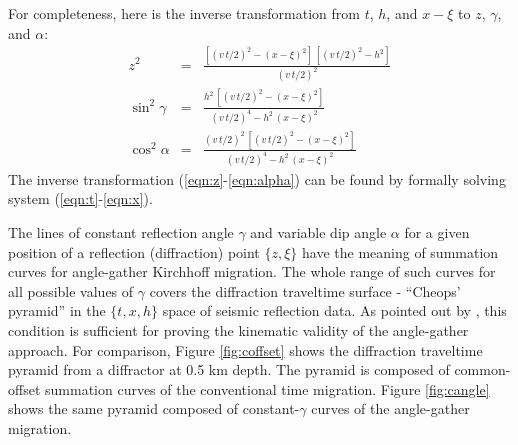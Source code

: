 For completeness, here is the inverse transformation from $t$, $h$,
and $x-\xi$ to $z$, $\gamma$, and $\alpha$:
\begin{eqnarray}
  \label{eqn:z}
  z^2 & = & 
  \frac{
    \left[(v\,t/2)^2 - (x-\xi)^2\right]\,
    \left[(v\,t/2)^2 - h^2\right]
    }{(v\,t/2)^2} 
  \\ \label{eqn:gamma}
  \sin^2{\gamma} & = & 
  \frac{h^2\, \left[(v\,t/2)^2 - (x-\xi)^2\right]}
  {(v\,t/2)^4 - h^2\,(x-\xi)^2}
  \\ \label{eqn:alpha}
  \cos^2{\alpha} & = & 
  \frac{(v\,t/2)^2\, \left[(v\,t/2)^2 - (x-\xi)^2\right]}
  {(v\,t/2)^4 - h^2\,(x-\xi)^2}
\end{eqnarray}
The inverse transformation (\ref{eqn:z}-\ref{eqn:alpha}) can be found
by formally solving system (\ref{eqn:t}-\ref{eqn:x}).
\par
The lines of constant reflection angle $\gamma$ and variable dip angle
$\alpha$ for a given position of a reflection (diffraction) point
$\{z,\xi\}$ have the meaning of summation curves for angle-gather
Kirchhoff migration. The whole range of such curves for all possible
values of $\gamma$ covers the diffraction traveltime surface -
``Cheops' pyramid'' \cite[]{Claerbout.blackwell.85} in the $\{t,x,h\}$
space of seismic reflection data.  As pointed out by
\cite{SEG-1997-1571}, this condition is sufficient for proving the
kinematic validity of the angle-gather approach.  For comparison,
Figure \ref{fig:coffset} shows the diffraction traveltime pyramid from
a diffractor at 0.5 km depth.  The pyramid is composed of
common-offset summation curves of the conventional time migration.
Figure \ref{fig:cangle} shows the same pyramid composed of
constant-$\gamma$ curves of the angle-gather migration.




